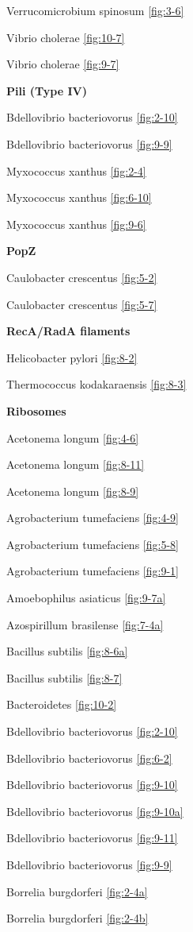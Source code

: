 \documentclass[]{tufte-book}
\begin{document}
Verrucomicrobium spinosum \ref{fig:3-6}

Vibrio cholerae \ref{fig:10-7}

Vibrio cholerae \ref{fig:9-7}

\textbf{Pili (Type IV)}

Bdellovibrio bacteriovorus \ref{fig:2-10}

Bdellovibrio bacteriovorus \ref{fig:9-9}

Myxococcus xanthus \ref{fig:2-4}

Myxococcus xanthus \ref{fig:6-10}

Myxococcus xanthus \ref{fig:9-6}

\textbf{PopZ}

Caulobacter crescentus \ref{fig:5-2}

Caulobacter crescentus \ref{fig:5-7}

\textbf{RecA/RadA filaments}

Helicobacter pylori \ref{fig:8-2}

Thermococcus kodakaraensis \ref{fig:8-3}

\textbf{Ribosomes}

Acetonema longum \ref{fig:4-6}

Acetonema longum \ref{fig:8-11}

Acetonema longum \ref{fig:8-9}

Agrobacterium tumefaciens \ref{fig:4-9}

Agrobacterium tumefaciens \ref{fig:5-8}

Agrobacterium tumefaciens \ref{fig:9-1}

Amoebophilus asiaticus \ref{fig:9-7a}

Azospirillum brasilense \ref{fig:7-4a}

Bacillus subtilis \ref{fig:8-6a}

Bacillus subtilis \ref{fig:8-7}

Bacteroidetes \ref{fig:10-2}

Bdellovibrio bacteriovorus \ref{fig:2-10}

Bdellovibrio bacteriovorus \ref{fig:6-2}

Bdellovibrio bacteriovorus \ref{fig:9-10}

Bdellovibrio bacteriovorus \ref{fig:9-10a}

Bdellovibrio bacteriovorus \ref{fig:9-11}

Bdellovibrio bacteriovorus \ref{fig:9-9}

Borrelia burgdorferi \ref{fig:2-4a}

Borrelia burgdorferi \ref{fig:2-4b}
\end{document}
